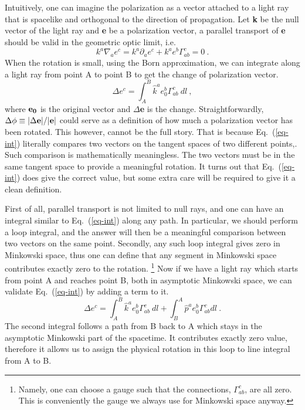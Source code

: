 \documentclass[aps,showpacs,twocolumn,floats,prd,superscriptaddress,nofootinbib]{revtex4-1}
\begin{document}
Intuitively, one can imagine the polarization as a vector attached to a light ray that is spacelike and orthogonal to the direction of propagation. 
Let {\bf k} be the null vector of the light ray and {\bf e} be a polarization vector, a parallel transport of {\bf e} should be valid in the geometric optic limit, i.e.
\begin{equation}
k^a \nabla_a e^c = k^a \partial_a e^c + k^a e^b \Gamma_{ab}^c =0~.
\label{eq-para}
\end{equation}
When the rotation is small, using the Born approximation, we can integrate along a light ray from point A to point B to get the change of polarization vector.
\begin{equation}
\Delta e^c = \int_A^B \hat{k}^a e_0^b \Gamma_{ab}^c~dl~,
\label{eq-int}
\end{equation}
where ${\bf e_0}$ is the original vector and $\Delta${\bf e} is the change. 
Straightforwardly, $\Delta \phi \equiv |\Delta {\bf e}|/|{\bf e}|$ could serve as a definition of how much a polarization vector has been rotated.
This however, cannot be the full story.
That is because Eq.~(\ref{eq-int}) literally compares two vectors on the tangent spaces of two different points,.
Such comparison is mathematically meaningless. 
The two vectors must be in the same tangent space to provide a meaningful rotation. 
It turns out that Eq.~(\ref{eq-int}) does give the correct value, but some extra care will be required to give it a clean definition.

First of all, parallel transport is not limited to null rays, and one can have an integral similar to Eq.~(\ref{eq-int}) along any path. 
In particular, we should perform a loop integral, and the answer will then be a meaningful comparison between two vectors on the same point. 
Secondly, any such loop integral gives zero in Minkowski space, thus one can define  that any segment in Minkowski space contributes exactly zero to the rotation.
\footnote{Namely, one can choose a gauge such that the connections, $\Gamma_{ab}^c$, are all zero.
This is conveniently the gauge we always use for Minkowski space anyway.} 
Now if we have a light ray which starts from point A and reaches point B, both in asymptotic Minkowski space, we can validate Eq.~(\ref{eq-int}) by adding a term to it.
\begin{equation}
\Delta e^c = \int_A^B \hat{k}^a e_0^b \Gamma_{ab}^c~dl +
 \int_B^A \hat{p}^a e_0^b \Gamma_{ab}^c dl~.
\label{eq-loop}
\end{equation}
The second integral follows a path from B back to A which stays in the asymptotic Minkowski part of the spacetime. 
It contributes exactly zero value, therefore it allows us to assign the physical rotation in this loop to line integral from A to B.
\end{document}
